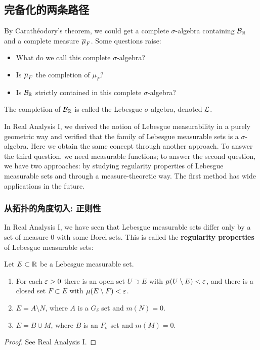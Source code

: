 \subsection{完备化的两条路径}
By Carath\'eodory's theorem, we could get a complete $\sigma$-algebra containing $\mathcal{B}_{\mathbb{R}}$ and a complete measure $\overline{\mu}_F$. Some questions raise:
\begin{itemize}
    \item What do we call this complete $\sigma$-algebra?
    \item Is $\overline{\mu}_F$ the completion of $\mu_F$?
    \item Is $\mathcal{B}_{\mathbb{R}}$ strictly contained in this complete $\sigma$-algebra?
\end{itemize}
\begin{definition}
    The completion of $\mathcal{B}_{\mathbb{R}}$ is called the Lebesgue $\sigma$-algebra, denoted $\mathcal{L}$. 
\end{definition}
In Real Analysis I, we derived the notion of Lebesgue measurability in a purely geometric way and verified that the family of Lebesgue measurable sets is a $\sigma$-algebra. 
Here we obtain the same concept through another approach. 
To answer the third question, we need measurable functions; to answer the second question, we have two approaches: by studying regularity properties of Lebesgue measurable sets and through a measure-theoretic way. 
The first method has wide applications in the future. 

\subsubsection*{从拓扑的角度切入: 正则性}
In Real Analysis I, we have seen that Lebesgue measurable sets differ only by a set of measure $0$ with some Borel sets. This is called the \textbf{regularity properties} of Lebesgue measurable sets:
\begin{proposition}
    Let $E \subset \mathbb{R}$ be a Lebesgue measurable set. 
    \begin{enumerate}
    \item For each $\varepsilon>0$ there is an open set $U \supset E$ with $\mu(U \setminus E) < \varepsilon$, and there is a closed set $F \subset E$ with $\mu(E \setminus F) < \varepsilon$. 
    \item $E = A \setminus N$, where $A$ is a $G_\delta$ set and $m(N)=0$. 
    \item $E = B \cup M$, where $B$ is an $F_\sigma$ set and $m(M) = 0$. 
    \end{enumerate}
\end{proposition}
\begin{proof}
    See Real Analysis I. 
\end{proof}



